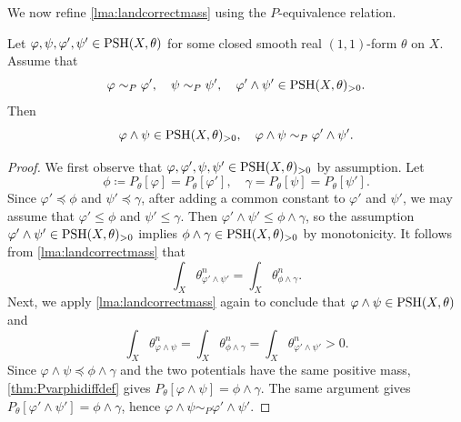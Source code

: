 We now refine \cref{lma:landcorrectmass} using the $P$-equivalence relation.
\begin{proposition}\label{prop:rooftopprePequiv}
    Let $\varphi,\psi,\varphi',\psi'\in \mathrm{PSH}(X,\theta)$ for some closed smooth real $(1,1)$-form $\theta$ on $X$. Assume that
    \[
    \varphi\sim_P \varphi',\quad \psi\sim_P\psi',\quad  \varphi'\land \psi'\in \mathrm{PSH}(X,\theta)_{>0}.
    \]
    Then
    \[
    \varphi\land \psi\in \mathrm{PSH}(X,\theta)_{>0},\quad \varphi\land \psi\sim_P \varphi'\land \psi'.
    \]
\end{proposition}
\begin{proof}
    We first observe that $\varphi,\varphi',\psi,\psi'\in \mathrm{PSH}(X,\theta)_{>0}$ by assumption. Let
    \[
    \phi\coloneqq P_{\theta}[\varphi]=P_{\theta}[\varphi'],\quad \gamma=P_{\theta}[\psi]=P_{\theta}[\psi'].
    \]
    Since $\varphi'\preceq\phi$ and $\psi'\preceq\gamma$, after adding a common constant to $\varphi'$ and $\psi'$, we may assume that $\varphi'\leq\phi$ and $\psi'\leq\gamma$. Then $\varphi'\land\psi'\leq\phi\land\gamma$, so the assumption $\varphi'\land\psi'\in \mathrm{PSH}(X,\theta)_{>0}$ implies $\phi\land \gamma \in \mathrm{PSH}(X,\theta)_{>0}$ by monotonicity. It follows from \cref{lma:landcorrectmass} that
    \[
    \int_X \theta_{\varphi'\land \psi'}^n=\int_X \theta_{\phi\land \gamma}^n.
    \]
    Next, we apply \cref{lma:landcorrectmass} again to conclude that $\varphi\land \psi\in \mathrm{PSH}(X,\theta)$ and
    \[
    \int_X \theta_{\varphi\land \psi}^n=\int_X \theta_{\phi\land \gamma}^n=\int_X \theta_{\varphi'\land \psi'}^n>0.
    \]
    Since $\varphi\land\psi\preceq \phi\land\gamma$ and the two potentials have the same positive mass, \cref{thm:Pvarphidiffdef} gives $P_{\theta}[\varphi\land\psi]=\phi\land\gamma$. The same argument gives $P_{\theta}[\varphi'\land\psi']=\phi\land\gamma$, hence $\varphi\land\psi\sim_P\varphi'\land\psi'$.
\end{proof}

